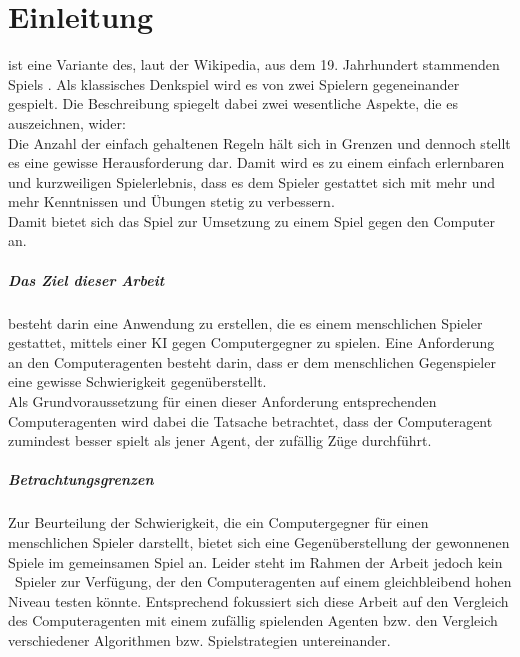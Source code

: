 \chapter{Einleitung}
\authormax
\mxZitat{\ot} ist eine Variante des, laut der Wikipedia, aus dem 19. Jahrhundert stammenden Spiels  \cite{Wiki:EN:Reversi}. Als klassisches Denkspiel wird es von zwei Spielern gegeneinander gespielt. Die Beschreibung  \cite{Rose} spiegelt dabei zwei wesentliche Aspekte, die es auszeichnen, wider:
\\Die Anzahl der einfach gehaltenen Regeln hält sich in Grenzen und dennoch stellt es eine gewisse Herausforderung dar. Damit wird es zu einem einfach erlernbaren und kurzweiligen Spielerlebnis, dass es dem Spieler gestattet sich mit mehr und mehr Kenntnissen und Übungen stetig zu verbessern.
\\Damit bietet sich das Spiel zur Umsetzung zu einem Spiel gegen den Computer an.
\paragraph{Das Ziel dieser Arbeit} besteht darin eine Anwendung zu erstellen, die es einem menschlichen Spieler gestattet, mittels einer \ac{KI} gegen Computergegner \mxZitat{\ot} zu spielen. Eine Anforderung an den Computeragenten besteht darin, dass er dem menschlichen Gegenspieler eine gewisse Schwierigkeit gegenüberstellt.
\\Als Grundvoraussetzung für einen dieser Anforderung entsprechenden Computeragenten wird dabei die Tatsache betrachtet, dass der Computeragent zumindest besser spielt als jener Agent, der zufällig Züge durchführt.
\paragraph{Betrachtungsgrenzen}
Zur Beurteilung der Schwierigkeit, die ein Computergegner für einen menschlichen Spieler darstellt, bietet sich eine Gegenüberstellung der gewonnenen Spiele im gemeinsamen Spiel an. Leider steht im Rahmen der Arbeit jedoch kein \ot\ Spieler zur Verfügung, der den Computeragenten auf einem gleichbleibend hohen Niveau testen könnte. Entsprechend fokussiert sich diese Arbeit auf den Vergleich des Computeragenten mit einem zufällig spielenden Agenten bzw. den Vergleich verschiedener Algorithmen bzw. Spielstrategien untereinander.
\newpage
